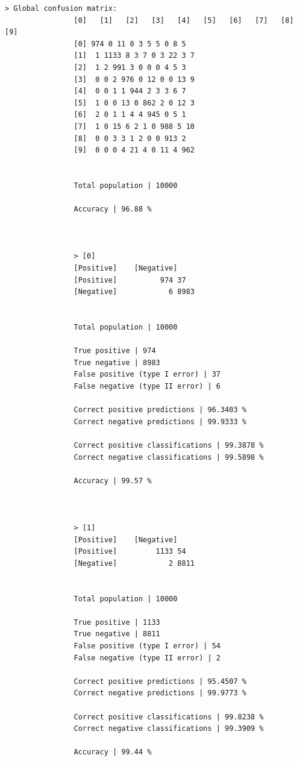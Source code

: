 \documentclass{classrep}
\begin{document}
{{{\begin{lstlisting}
> Global confusion matrix:
                [0]   [1]   [2]   [3]   [4]   [5]   [6]   [7]   [8]   [9]
                [0] 974 0 11 0 3 5 5 0 8 5
                [1]  1 1133 8 3 7 0 3 22 3 7
                [2]  1 2 991 3 0 0 0 4 5 3
                [3]  0 0 2 976 0 12 0 0 13 9
                [4]  0 0 1 1 944 2 3 3 6 7
                [5]  1 0 0 13 0 862 2 0 12 3
                [6]  2 0 1 1 4 4 945 0 5 1
                [7]  1 0 15 6 2 1 0 988 5 10
                [8]  0 0 3 3 1 2 0 0 913 2
                [9]  0 0 0 4 21 4 0 11 4 962


                Total population | 10000

                Accuracy | 96.88 %



                > [0]
                [Positive]    [Negative]
                [Positive]          974 37
                [Negative]            6 8983


                Total population | 10000

                True positive | 974
                True negative | 8983
                False positive (type I error) | 37
                False negative (type II error) | 6

                Correct positive predictions | 96.3403 %
                Correct negative predictions | 99.9333 %

                Correct positive classifications | 99.3878 %
                Correct negative classifications | 99.5898 %

                Accuracy | 99.57 %



                > [1]
                [Positive]    [Negative]
                [Positive]         1133 54
                [Negative]            2 8811


                Total population | 10000

                True positive | 1133
                True negative | 8811
                False positive (type I error) | 54
                False negative (type II error) | 2

                Correct positive predictions | 95.4507 %
                Correct negative predictions | 99.9773 %

                Correct positive classifications | 99.8238 %
                Correct negative classifications | 99.3909 %

                Accuracy | 99.44 %




\end{lstlisting}}}}
\end{document}
